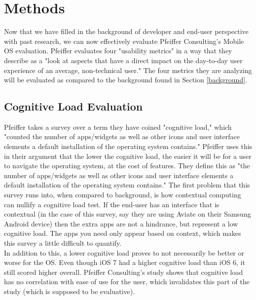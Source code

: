 \documentclass[11pt]{article}
\begin{document}
\section{Methods}
Now that we have filled in the background of developer and end-user perspective with past research, we can now effectively evaluate Pfeiffer Consulting's Mobile OS evaluation. Pfeiffer evaluates four "usability metrics" in a way that they describe as a "look at aspects that have a direct impact on the day-to-day user experience of an average, non-technical user." \cite{Pfeiffer} The four metrics they are analyzing will be evaluated as compared to the background found in Section \ref{background}.
\subsection{Cognitive Load Evaluation}
Pfeiffer takes a survey over a term they have coined "cognitive load," which "counted
the number of apps/widgets as well as other icons and user interface elements a default installation of the operating system contains." \cite{Pfeiffer} Pfeiffer uses this in their argument that the lower the cognitive load, the easier it will be for a user to navigate the operating system, at the cost of features. They define this as "the number of apps/widgets as well as other icons and user interface elements a default installation of the operating system contains." \cite{Pfeiffer} The first problem that this survey runs into, when compared to background, is how contextual computing can nullify a cognitive load test. If the end-user has an interface that is contextual (in the case of this survey, say they are using Aviate on their Samsung Android device) then the extra apps are not a hindrance, but represent a low cognitive load. The apps you need only appear based on context, which makes this survey a little difficult to quantify. \\
\indent In addition to this, a lower cognitive load proves to not necessarily be better or worse for the OS. Even though iOS 7 had a higher cognitive load than iOS 6, it still scored higher overall. Pfeiffer Consulting's study shows that cognitive load has no correlation with ease of use for the user, which invalidates this part of the study (which is supposed to be evaluative).
\end{document}
